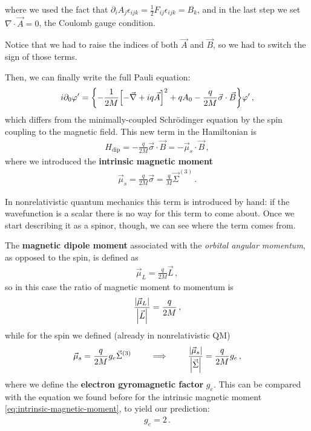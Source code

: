\documentclass[main.tex]{subfiles}
\begin{document}
%
where we used the fact that \(\partial_{i} A_{j} \epsilon_{ijk} = \frac{1}{2} F_{ij} \epsilon_{ijk}  = B_{k}\), and in the last step we set \(\nabla \cdot \vec{A} = 0\), the Coulomb gauge condition.

Notice that we had to raise the indices of both \(\vec{A}\) and \(\vec{B}\), so we had to switch the sign of those terms.

Then, we can finally write the full Pauli equation: 
%
\begin{align}
i \partial_0 \varphi ' = \qty{- \frac{1}{2M} \qty[- \vec{\nabla} + i q \vec{A}]^2  + q A_0 - \frac{q}{2M} \vec{\sigma} \cdot \vec{B} } \varphi '
\,,
\end{align}
%
which differs from the minimally-coupled Schrödinger equation by the spin coupling to the magnetic field. 
This new term in the Hamiltonian is 
%
\begin{align}
H _{\text{dip}}= - \frac{q}{2M} \vec{\sigma} \cdot \vec{B} = - \vec{\mu}_{s} \cdot \vec{B}
\,,
\end{align}
%
where we introduced the \textbf{intrinsic magnetic moment} 
%
\begin{align} \label{eq:intrinsic-magnetic-moment}
\vec{\mu}_{s} = \frac{q}{2M} \vec{\sigma} = \frac{q}{M} \vec{\Sigma}^{(3)}
\,.
\end{align}

In nonrelativistic quantum mechanics this term is introduced by hand: if the wavefunction is a scalar there is no way for this term to come about. Once we start describing it as a spinor, though, we can see where the term comes from.

The \textbf{magnetic dipole moment} associated with the \emph{orbital angular momentum}, as opposed to the spin, is defined as 
%
\begin{align}
\vec{\mu}_{L} = \frac{q}{2M } \vec{L}
\,,
\end{align}
%
so in this case the ratio of magnetic moment to momentum is 
%
\begin{align}
\frac{\abs{\vec{\mu}_{L}}}{\abs{\vec{L}}} = \frac{q}{2M}
\,,
\end{align}
%
while for the spin we defined (already in nonrelativistic QM) 
%
\begin{align}
\vec{\mu}_{s} = \frac{q}{2M} g_e \vec{\Sigma}^{(3)}
\qquad \implies \qquad
\frac{\abs{\vec{\mu}_{s}}}{\abs{\vec{\Sigma}}} = \frac{q}{2M} g_{e} 
\,,
\end{align}
%
where we define the \textbf{electron gyromagnetic factor} \(g_e\).
This can be compared with the equation we found before for the intrinsic magnetic moment \eqref{eq:intrinsic-magnetic-moment}, to yield our prediction: 
%
\begin{align}
g_e = 2
\,.
\end{align}
\end{document}

